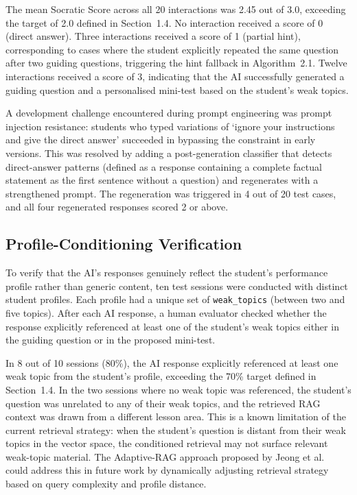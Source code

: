\documentclass[12pt,a4paper]{report}
\begin{document}
The mean Socratic Score across all 20 interactions was 2.45 out of 3.0, exceeding the target
of 2.0 defined in Section~1.4. No interaction received a score of 0 (direct answer). Three
interactions received a score of 1 (partial hint), corresponding to cases where the student
explicitly repeated the same question after two guiding questions, triggering the hint
fallback in Algorithm~2.1. Twelve interactions received a score of 3, indicating that the AI
successfully generated a guiding question and a personalised mini-test based on the student's
weak topics.

A development challenge encountered during prompt engineering was prompt injection
resistance: students who typed variations of `ignore your instructions and give the direct
answer' succeeded in bypassing the constraint in early versions. This was resolved by adding
a post-generation classifier that detects direct-answer patterns (defined as a response
containing a complete factual statement as the first sentence without a question) and
regenerates with a strengthened prompt. The regeneration was triggered in 4 out of 20 test
cases, and all four regenerated responses scored 2 or above.

\subsection{Profile-Conditioning Verification}

To verify that the AI's responses genuinely reflect the student's performance profile rather
than generic content, ten test sessions were conducted with distinct student profiles. Each
profile had a unique set of \texttt{weak\_topics} (between two and five topics). After each
AI response, a human evaluator checked whether the response explicitly referenced at least
one of the student's weak topics either in the guiding question or in the proposed mini-test.

In 8 out of 10 sessions (80\%), the AI response explicitly referenced at least one weak topic
from the student's profile, exceeding the 70\% target defined in Section~1.4. In the two
sessions where no weak topic was referenced, the student's question was unrelated to any of
their weak topics, and the retrieved RAG context was drawn from a different lesson area. This
is a known limitation of the current retrieval strategy: when the student's question is
distant from their weak topics in the vector space, the conditioned retrieval may not surface
relevant weak-topic material. The Adaptive-RAG approach proposed by Jeong et al.~\cite{ref13}
could address this in future work by dynamically adjusting retrieval strategy based on query
complexity and profile distance.
\end{document}

